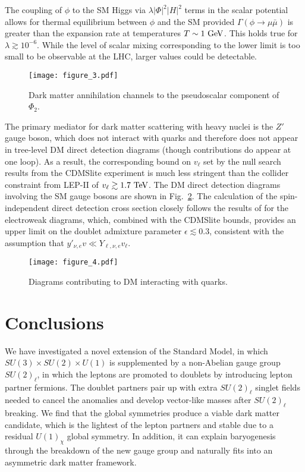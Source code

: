 \documentclass[prd,showpcs,amsmath,amssymb,nofootinbib,preprintnumbers,balancelastpage,longbibliography,superscriptaddress,notitlepage]{revtex4}
\begin{document}
The coupling of $\phi$ to the SM Higgs via $\lambda |\Phi|^2 |H|^2$ terms in the scalar potential allows for thermal equilibrium between $\phi$ and the SM provided $\Gamma(\phi \rightarrow \mu \bar{\mu})$ is greater than the expansion rate at temperatures $T\sim 1 ~ \rm GeV$.  This holds true for $\lambda \gtrsim 10^{-6}$.  While the level of scalar mixing corresponding to the  lower limit is too small to be observable at the LHC, larger values could be detectable. 

\begin{figure}[t!]
  \centering
      \texttt{[image: figure\_3.pdf]}
  \caption{\small{Dark matter annihilation channels to the pseudoscalar component of $\Phi_2$.}}
  \label{fig:Higgs_ann}
\end{figure}



The primary mediator for dark matter scattering with heavy nuclei is the
$Z'$ gauge boson, which does not interact with quarks and therefore does not appear in tree-level DM direct detection diagrams 
(though contributions do appear at one loop). As a result, the corresponding bound on $v_\ell$ set by the null search results from the CDMSlite 
experiment \cite{Agnese:2015nto} is much less stringent than the collider constraint from LEP-II of $v_\ell \gtrsim 1.7 \ \rm TeV$. 
The DM direct detection diagrams involving the SM gauge bosons are shown in Fig.~\ref{fig:111}. The calculation of the spin-independent direct detection cross section closely follows the results of \cite{Fornal:2016boa} for the electroweak diagrams, which, combined with the CDMSlite bounds, 
provides an upper limit on the doublet admixture parameter $\epsilon \lesssim 0.3$, consistent with the assumption that $y'_{\nu,e} v \ll Y_{\ell, \nu, e} v_\ell$.

\begin{figure}[t!]
  \centering
      \texttt{[image: figure\_4.pdf]}
\caption{\small{Diagrams contributing  to  DM interacting with quarks.}}
  \label{fig:111}
\end{figure}




\section{Conclusions}

We have investigated a novel extension of the Standard Model, in which $SU(3) \times SU(2) \times U(1)$ is supplemented 
by a non-Abelian gauge group $SU(2)_\ell$, in which the leptons are promoted to doublets by introducing lepton partner fermions. 
The doublet partners pair up with extra $SU(2)_\ell$ singlet fields needed to cancel the anomalies and develop vector-like masses after $SU(2)_\ell$ breaking.
We find that the global symmetries produce a 
viable dark matter candidate, which is the lightest of the lepton partners and stable due to a residual $U(1)_\chi$ global symmetry. 
In addition, it can explain baryogenesis through the breakdown of the new gauge group and naturally fits into an asymmetric dark matter framework. 
\end{document}
